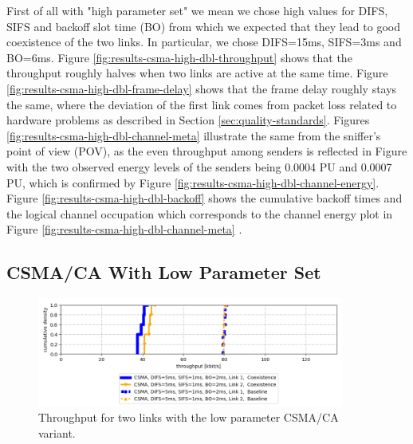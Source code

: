 First of all with "high parameter set" we mean we chose high values for DIFS, SIFS and backoff slot time (BO) from which we expected that they lead to good coexistence of the two links. In particular, we chose DIFS=15ms, SIFS=3ms and BO=6ms. Figure \ref{fig:results-csma-high-dbl-throughput} shows that the throughput roughly halves when two links are active at the same time. Figure \ref{fig:results-csma-high-dbl-frame-delay} shows that the frame delay roughly stays the same, where the deviation of the first link comes from packet loss related to hardware problems as described in Section \ref{sec:quality-standards}. Figures \ref{fig:results-csma-high-dbl-channel-meta} illustrate the same from the sniffer's point of view (POV), as the even throughput among senders is reflected in Figure  with the two observed energy levels of the senders being 0.0004 PU and 0.0007 PU, which is confirmed by Figure \ref{fig:results-csma-high-dbl-channel-energy}. Figure \ref{fig:results-csma-high-dbl-backoff} shows the cumulative backoff times and the logical channel occupation which corresponds to the channel energy plot in Figure \ref{fig:results-csma-high-dbl-channel-meta} . 

\clearpage

\subsection{CSMA/CA With Low Parameter Set}
\label{sec:csma-dbl-low}

\begin{figure}[tb]
	\label{fig:results-csma-low-dbl-throughput}
	\begin{center}
		\includegraphics[width=0.9\textwidth]{pictures/results/same_combinations/csma_low_params/throughput_cdf}
	\end{center}
	\caption{Throughput for two links with the low parameter CSMA/CA variant.}
\end{figure}

